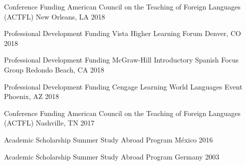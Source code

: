 \begin{cvhonors}

\cvhonor
{Conference Funding} %
{American Council on the Teaching of Foreign Languages (ACTFL) } %
{New Orleans, LA} %
{2018} %


\cvhonor
{Professional Development Funding} %
{Vista Higher Learning Forum } %
{Denver, CO} %
{2018} %


\cvhonor
{Professional Development Funding} %
{McGraw-Hill Introductory Spanish Focus Group} %
{Redondo Beach, CA} %
{2018} %


\cvhonor
{Professional Development Funding} %
{Cengage Learning World Languages Event} %
{Phoenix, AZ} %
{2018} %



\cvhonor
{Conference Funding} %
{American Council on the Teaching of Foreign Languages (ACTFL) } %
{Nashville, TN} %
{2017} %


\cvhonor
{Academic Scholarship} %
{Summer Study Abroad Program} %
{México} %
{2016} %


\cvhonor
{Academic Scholarship} %
{Summer Study Abroad Program} %
{Germany} %
{2003} %


\end{cvhonors}